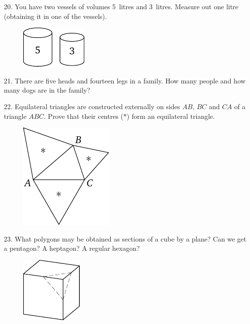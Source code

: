 \begin{problem}{20.}
	You have two vessels of volumes 5~litres and 3~litres. Measure out one litre (obtaining it in one of the vessels).
	\begin{figure}
		\includegraphics{resources/taskbook-4}
	\end{figure}
\end{problem}

\begin{problem}{21.}
	There are five heads and fourteen legs in a family. How many people and how many dogs are in the family?
\end{problem}

\begin{problem}{22.}
	Equilateral triangles are constructed externally on sides $AB$, $BC$ and $CA$ of a triangle $ABC$.
	Prove that their centres ($*$) form an equilateral triangle.
	\begin{figure}
		\includegraphics{resources/taskbook-6}
	\end{figure}
\end{problem}

\begin{problem}{23.}
	What polygons may be obtained as sections of a cube by a plane? Can we get a pentagon? A heptagon?
	A regular hexagon?
	\begin{figure}
		\includegraphics{resources/taskbook-7}
	\end{figure}
\end{problem}

